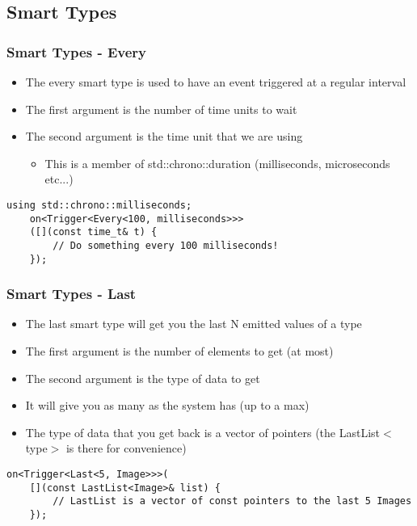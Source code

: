 \documentclass{beamer}
\begin{document}
\subsection{Smart Types}
\begin{frame}[fragile]
	\frametitle{Smart Types - Every}
	\begin{itemize}
		\item The every smart type is used to have an event triggered at a regular interval
		\item The first argument is the number of time units to wait
		\item The second argument is the time unit that we are using
		\begin{itemize}
			\item This is a member of std::chrono::duration (milliseconds, microseconds etc...)
		\end{itemize}
	\end{itemize}

	\begin{lstlisting}[language=nuclear]
	using std::chrono::milliseconds;
	on<Trigger<Every<100, milliseconds>>>
	([](const time_t& t) {
	    // Do something every 100 milliseconds!
	});
	\end{lstlisting}
\end{frame}

\begin{frame}[fragile]
	\frametitle{Smart Types - Last}
	\begin{itemize}
		\item The last smart type will get you the last N emitted values of a type
		\item The first argument is the number of elements to get (at most)
		\item The second argument is the type of data to get
		\item It will give you as many as the system has (up to a max)
		\item The type of data that you get back is a vector of pointers (the LastList$<$type$>$ is there for convenience)
	\end{itemize}
	
	\begin{lstlisting}[language=nuclear]
	on<Trigger<Last<5, Image>>>(
	[](const LastList<Image>& list) {
	    // LastList is a vector of const pointers to the last 5 Images
	});
	\end{lstlisting}
\end{frame}
\end{document}
